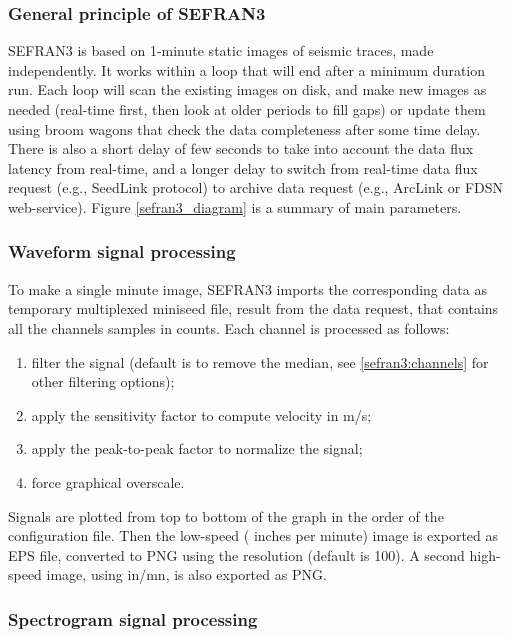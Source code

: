 \subsubsection{General principle of SEFRAN3}

SEFRAN3 is based on 1-minute static images of seismic traces, made independently. It works within a loop that will end after a minimum duration run. Each loop will scan the existing images on disk, and make new images as needed (real-time first, then look at older periods to fill gaps) or update them using broom wagons that check the data completeness after some time delay. There is also a short delay of few seconds to take into account the data flux latency from real-time, and a longer delay to switch from real-time data flux request (e.g., SeedLink protocol) to archive data request (e.g., ArcLink or FDSN web-service). Figure \ref{sefran3_diagram} is a summary of main parameters.

\subsubsection{Waveform signal processing}

To make a single minute image, SEFRAN3 imports the corresponding data as temporary multiplexed miniseed file, result from the data request, that contains all the channels samples in counts. Each channel is processed as follows:
\begin{enumerate}
\item filter the signal (default is to remove the median, see \ref{sefran3:channels} for other filtering options);
\item apply the sensitivity factor to compute velocity in m/s;
\item apply the peak-to-peak factor to normalize the signal;
\item force graphical overscale.
\end{enumerate}

Signals are plotted from top to bottom of the graph in the order of the  configuration file. Then the low-speed ( inches per minute) image is exported as EPS file, converted to PNG using the resolution  (default is 100). A second high-speed image, using  in/mn, is also exported as PNG.

\subsubsection{Spectrogram signal processing}

